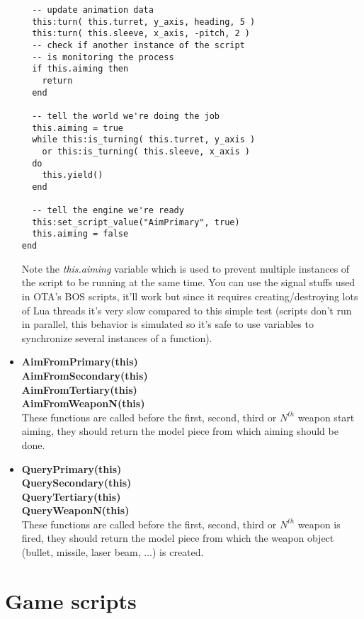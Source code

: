 \documentclass[a4paper,10pt]{article}
\begin{document}
\begin{itemize}
\begin{lstlisting}
  -- update animation data
  this:turn( this.turret, y_axis, heading, 5 )
  this:turn( this.sleeve, x_axis, -pitch, 2 )
  -- check if another instance of the script
  -- is monitoring the process
  if this.aiming then
    return
  end

  -- tell the world we're doing the job
  this.aiming = true
  while this:is_turning( this.turret, y_axis )
	or this:is_turning( this.sleeve, x_axis )
  do
    this.yield()
  end

  -- tell the engine we're ready
  this:set_script_value("AimPrimary", true)
  this.aiming = false
end
\end{lstlisting}
  Note the \emph{this.aiming} variable which is used to prevent multiple instances of the script to be running at the same time. You can use the signal stuffs used in OTA's BOS scripts, it'll work but since it requires creating/destroying lots of Lua threads it's very slow compared to this simple test (scripts don't run in parallel, this behavior is simulated so it's safe to use variables to synchronize several instances of a function).

 \item \textbf{AimFromPrimary(this)}\\
       \textbf{AimFromSecondary(this)}\\
       \textbf{AimFromTertiary(this)}\\
       \textbf{AimFromWeaponN(this)}\\
  These functions are called before the first, second, third or $N^{th}$ weapon start aiming, they should return the model piece from which aiming should be done.

 \item \textbf{QueryPrimary(this)}\\
       \textbf{QuerySecondary(this)}\\
       \textbf{QueryTertiary(this)}\\
       \textbf{QueryWeaponN(this)}\\
  These functions are called before the first, second, third or $N^{th}$ weapon is fired, they should return the model piece from which the weapon object (bullet, missile, laser beam, ...) is created.

\end{itemize}


\section{Game scripts}
\end{document}
